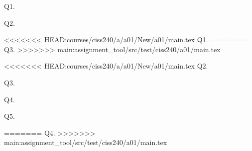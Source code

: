 


\newcommand\myincludetex[1]{\textbox{{\scriptsize \texttt{#1}}}


    

}

\newcommand\myincludesrc[1]{\textbox{{\scriptsize \texttt{#1}}}


    \VerbatimInput[fontsize=\footnotesize,frame=single]{#1}

}
    

        Q1. 
        
\newpage
        

        Q2. 
        
\newpage
        

<<<<<<< HEAD:courses/ciss240/a/a01/New/a01/main.tex
        Q1. 
=======
        Q3. 
>>>>>>> main:assignment_tool/src/test/ciss240/a01/main.tex
        
\newpage
        

<<<<<<< HEAD:courses/ciss240/a/a01/New/a01/main.tex
        Q2. 
        
\newpage
        

        Q3. 
        
\newpage
        

        Q4. 
        
\newpage
        

        Q5. 
        
\newpage
=======
        Q4. 
>>>>>>> main:assignment_tool/src/test/ciss240/a01/main.tex
        

    